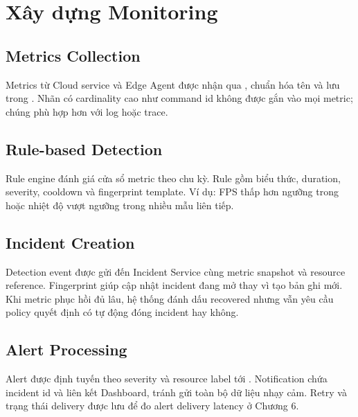 \section{Xây dựng Monitoring}

\subsection{Metrics Collection}

Metrics từ Cloud service và Edge Agent được nhận qua ,
chuẩn hóa tên và lưu trong . Nhãn có cardinality cao
như command id không được gắn vào mọi metric; chúng phù hợp hơn với log hoặc
trace.

\subsection{Rule-based Detection}

Rule engine đánh giá cửa sổ metric theo chu kỳ. Rule gồm biểu thức, duration,
severity, cooldown và fingerprint template. Ví dụ: FPS thấp hơn ngưỡng trong
 hoặc nhiệt độ vượt ngưỡng trong nhiều mẫu liên tiếp.

\subsection{Incident Creation}

Detection event được gửi đến Incident Service cùng metric snapshot và resource
reference. Fingerprint giúp cập nhật incident đang mở thay vì tạo bản ghi mới.
Khi metric phục hồi đủ lâu, hệ thống đánh dấu recovered nhưng vẫn yêu cầu policy
quyết định có tự động đóng incident hay không.

\subsection{Alert Processing}

Alert được định tuyến theo severity và resource label tới . Notification chứa incident id và liên kết Dashboard, tránh gửi toàn bộ
dữ liệu nhạy cảm. Retry và trạng thái delivery được lưu để đo alert delivery
latency ở Chương 6.